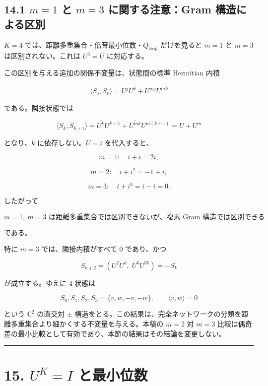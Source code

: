 \documentclass[
  a4paper,
]{ltjsarticle}
\begin{document}
\subsection{\texorpdfstring{14.1 \(m=1\) と \(m=3\) に関する注意：Gram
構造による区別}{14.1 m=1 と m=3 に関する注意：Gram 構造による区別}}\label{m1-ux3068-m3-ux306bux95a2ux3059ux308bux6ce8ux610fgram-ux69cbux9020ux306bux3088ux308bux533aux5225}

\(K=4\) では、距離多重集合・倍音最小位数・\(Q_{\mathrm{loop}}\)
だけを見ると \(m=1\) と \(m=3\) は区別されない。これは
\(U^3=\overline U\) に対応する。

この区別を与える追加の関係不変量は、状態間の標準 Hermitian 内積

\[
\langle S_j,S_k\rangle
=
\overline{U^j}U^k
+
\overline{U^{mj}}U^{mk}
\]

である。隣接状態では

\[
\langle S_k,S_{k+1}\rangle
=
\overline{U^k}U^{k+1}
+
\overline{U^{mk}}U^{m(k+1)}
=
U+U^m
\]

となり、\(k\) に依存しない。\(U=i\) を代入すると、

\[
m=1:\quad i+i=2i,
\]

\[
m=2:\quad i+i^2=-1+i,
\]

\[
m=3:\quad i+i^3=i-i=0.
\]

したがって

\[
\boxed{
m=1,\ m=3\text{ は距離多重集合では区別できないが、複素 Gram 構造では区別できる}
}
\]

である。

特に \(m=3\) では、隣接内積がすべて 0 であり、かつ

\[
S_{k+2}
=
\left(U^2 U^k,\;U^6 U^{3k}\right)
=
-S_k
\]

が成立する。ゆえに 4 状態は

\[
\boxed{
S_0,S_1,S_2,S_3
=
\{v,w,-v,-w\},
\qquad
\langle v,w\rangle=0
}
\]

という \(\mathbb C^2\) の直交対 \(\pm\)
構造をとる。この結果は、完全ネットワークの分類を距離多重集合より細かくする不変量を与える。本稿の
\(m=2\) 対 \(m=3\)
比較は偶奇差の最小比較として有効であり、本節の結果はその結論を変更しない。

\begin{center}\rule{0.5\linewidth}{0.5pt}\end{center}

\section{\texorpdfstring{15. \(U^K=I\)
と最小位数}{15. U\^{}K=I と最小位数}}\label{uki-ux3068ux6700ux5c0fux4f4dux6570}
\end{document}
